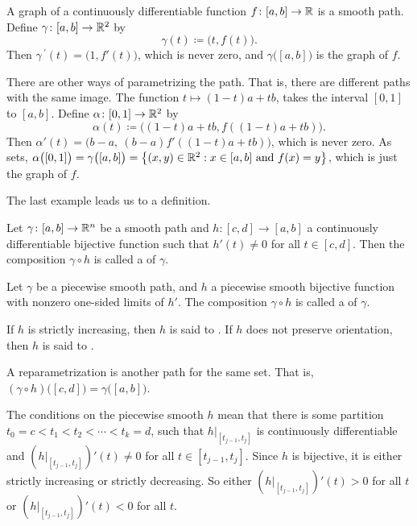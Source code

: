 \begin{example}
A graph of a continuously differentiable function $f \colon [a,b] \to {\mathbb{R}}$ is a smooth path.
Define $\gamma \colon [a,b] \to {\mathbb{R}}^2$ by
\begin{equation*}
\gamma(t) \coloneqq \bigl(t,f(t)\bigr) .
\end{equation*}
Then $\gamma^{\:\prime}(t) = \bigl( 1 , f'(t) \bigr)$, which is never zero,
and $\gamma\bigl([a,b]\bigr)$ is the graph of $f$.

There are other ways of parametrizing the path.  That is, there are
different paths with the same image.
The function $t \mapsto (1-t)a+tb$, takes the interval $[0,1]$ to $[a,b]$.
Define
$\alpha \colon [0,1] \to {\mathbb{R}}^2$ by
\begin{equation*}
\alpha(t) \coloneqq \bigl((1-t)a+tb,f((1-t)a+tb)\bigr) .
\end{equation*}
Then
$\alpha'(t) = \bigl( b-a ,~ (b-a)f'((1-t)a+tb) \bigr)$, which is never zero.
As sets, $\alpha\bigl([0,1]\bigr) = \gamma\bigl([a,b]\bigr)
= \bigl\{ (x,y) \in {\mathbb{R}}^2 : x \in [a,b] \text{ and } f(x) = y \bigr\}$,
which is just the graph of $f$.
\end{example}

The last example leads us to a definition.

\begin{defn}
Let $\gamma \colon [a,b] \to {\mathbb{R}}^n$ be a smooth path and
$h \colon [c,d] \to [a,b]$ a continuously differentiable bijective function
such that $h'(t) \not= 0$ for all $t \in [c,d]$.  Then
the composition
$\gamma \circ h$ is called a
\emph{}
of $\gamma$.

Let $\gamma$ be a piecewise smooth path, and
$h$ a piecewise smooth bijective function with
nonzero one-sided limits of $h'$.
The composition
$\gamma \circ h$ is called a
\emph{} of $\gamma$.

If $h$ is strictly increasing, then $h$ is 
said to \emph{}.  If $h$ does not preserve
orientation, then $h$ is said to \emph{}.
\end{defn}

A reparametrization is another path for the same set.  That is,
$(\gamma \circ h)\bigl([c,d]\bigr) =
\gamma \bigl([a,b]\bigr)$.

The conditions on the piecewise smooth $h$ mean that
there is some partition $t_0 = c < t_1 < t_2 < \cdots < t_k = d$,
such that $h|_{[t_{j-1},t_j]}$ is continuously differentiable
and $(h|_{[t_{j-1},t_j]})'(t) \not= 0$ for all $t \in [t_{j-1},t_j]$.
Since $h$ is bijective, it is either strictly increasing or
strictly decreasing.  So either $(h|_{[t_{j-1},t_j]})'(t) > 0$
for all $t$ or $(h|_{[t_{j-1},t_j]})'(t) < 0$ for all $t$.

